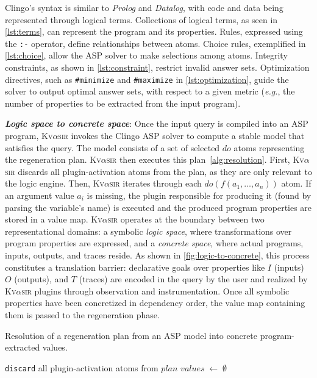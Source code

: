 \documentclass[nonacm,sigplan,review]{acmart}
\def\eg{{\em e.g.}, }
\newcommand{\sys}{{\scshape Kv{$\alpha$}sir}\xspace}
\newcommand{\heading}[1]{\vspace{2pt}\noindent\textbf{\emph{#1}}:\enspace}
\newcommand{\ttt}[1]{\texttt{#1}\xspace}
\begin{document}
Clingo's syntax is similar to \textit{Prolog} and \textit{Datalog}, with code and data being represented
through logical terms.
Collections of logical terms, as seen in
\cref{lst:terms}, can represent the program and its properties.
Rules, expressed using
the \ttt{:-} operator, define relationships
between atoms.
Choice rules, exemplified in \cref{lst:choice}, allow the ASP
solver to make selections among atoms.
Integrity constraints, as shown in
\cref{lst:constraint}, restrict invalid answer sets.
Optimization
directives, such as \ttt{\#minimize} and \ttt{\#maximize} in
\cref{lst:optimization}, guide the solver to output optimal answer sets,
with respect to a given metric (\eg the number of properties to be extracted from the input program).

\heading{Logic space to concrete space}
Once the input query is compiled into an ASP program, \sys invokes the Clingo
ASP solver to compute a stable model that satisfies the query.
The model consists of a set of selected $\mathit{do}$ atoms representing the regeneration plan.
\sys then executes this plan~\cref{alg:resolution}.
First, \sys discards all plugin-activation atoms from the plan, 
as they are only relevant to the logic engine.
Then, \sys iterates through each
$\mathit{do}(f(a_1,\dots,a_n))$ atom.
If an argument value $a_i$ is missing, the plugin responsible for producing
it (found by parsing the variable's name) is executed and the produced program properties are stored in a value map.
\sys operates at the boundary between two representational domains: a symbolic
\emph{logic space}, where transformations over program properties are expressed, and
a \emph{concrete space}, where actual programs, inputs, outputs, and traces
reside.
As shown in \cref{fig:logic-to-concrete}, this process constitutes a
translation barrier: declarative goals over properties like $I$ (inputs)
$O$ (outputs), and $T$ (traces) are encoded in the query by the user and realized by \sys plugins through observation and instrumentation.
Once all symbolic properties have been concretized in dependency order, the value map containing them is passed to the regeneration phase.

\begin{algorithm}[t]
\caption{Resolution of a regeneration plan from an ASP model into concrete program-extracted values.}
\label{alg:resolution}
\DontPrintSemicolon
{}
\ttt{discard} all plugin‐activation atoms from \(\mathit{plan}\)\;
\(\mathit{values}\;\gets\;\emptyset\)\;
\end{algorithm}
\end{document}
